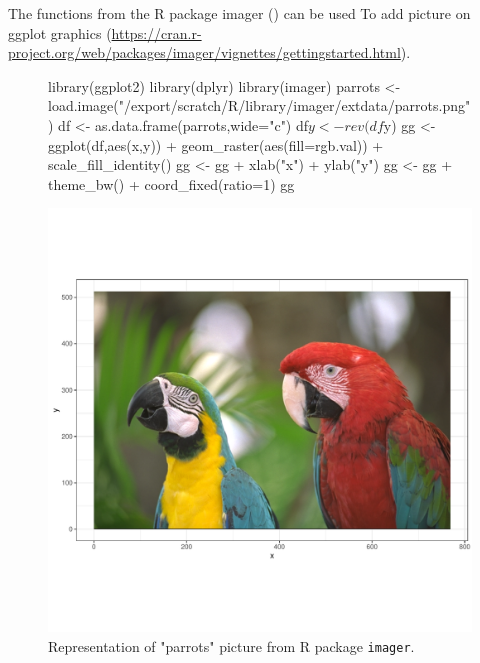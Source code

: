 \documentclass[a4paper,10pt]{article}
\begin{document}
The functions from the R package imager (\cite{imager}) can be used To add picture on ggplot graphics (\url{https://cran.r-project.org/web/packages/imager/vignettes/gettingstarted.html}).
\begin{figure}[H]
\begin{center}
\begin{Schunk}
\begin{Sinput}
  library(ggplot2)
  library(dplyr)
  library(imager)
  parrots <- load.image("/export/scratch/R/library/imager/extdata/parrots.png")
  df <- as.data.frame(parrots,wide="c") %
  df$y <- rev(df$y)
  gg <- ggplot(df,aes(x,y)) + geom_raster(aes(fill=rgb.val)) + scale_fill_identity()
  gg <- gg + xlab("x") + ylab("y")
  gg <- gg + theme_bw()  + coord_fixed(ratio=1)
  gg
\end{Sinput}
\end{Schunk}
\includegraphics{figs/sweave-image1}
\caption{Representation of "parrots" picture from R package \texttt{imager}.}
\label{fig:image1}
\end{center}
\end{figure}
\end{document}
